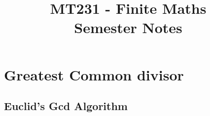 \documentclass[12pt]{article} %
\title{
    \vspace{2in}
        \textmd{\textbf{MT231 - Finite Maths}}\\
    \vspace{1in}
    \textmd{\textbf{Semester Notes}}\\
    \vspace{1in}
}
\date{}
\begin{document}
\maketitle

\pagebreak

\tableofcontents

\pagebreak

\section{Greatest Common divisor} %

\subsection{Euclid's Gcd Algorithm}
\end{document}
